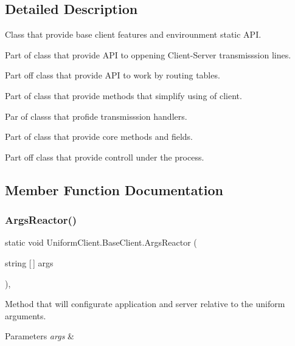 \subsection{Detailed Description}
Class that provide base client features and envirounment static A\+PI. 

Part of class that provide A\+PI to oppening Client-\/\+Server transmisssion lines. 

Part off class that provide A\+PI to work by routing tables. 

Part of class that provide methods that simplify using of client. 

Par of classs that profide transmisssion handlers. 

Part of class that provide core methods and fields. 

Part off class that provide controll under the process. 

\subsection{Member Function Documentation}
\mbox{\label{class_uniform_client_1_1_base_client_a7ec48981cf3e7ec10d2cb7dff81f912a}} 
\subsubsection{\texorpdfstring{Args\+Reactor()}{ArgsReactor()}}
{\footnotesize\ttfamily static void Uniform\+Client.\+Base\+Client.\+Args\+Reactor (\begin{DoxyParamCaption}\item[{string \mbox{[}$\,$\mbox{]}}]{args }\end{DoxyParamCaption})\hspace{0.3cm}{\ttfamily [static]}, {\ttfamily [protected]}}



Method that will configurate application and server relative to the uniform arguments. 


\begin{DoxyParams}{Parameters}
{\em args} & \\
\hline
\end{DoxyParams}
\mbox{\label{class_uniform_client_1_1_base_client_a964bd521f46fd99f64b10257c5d233ef}} 
